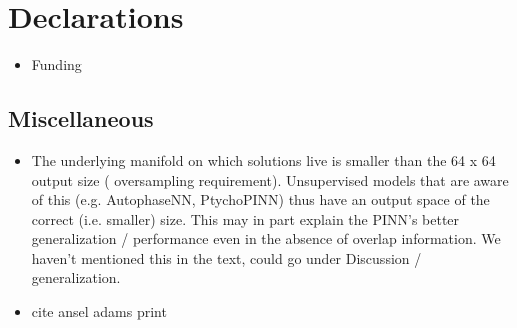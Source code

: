 \documentclass[sn-mathphys]{sn-jnl}%
\theoremstyle{thmstyleone}%
\theoremstyle{thmstyletwo}%
\theoremstyle{thmstylethree}%
\begin{document}
\backmatter



\section*{Declarations}

\begin{itemize}
\item Funding
\end{itemize}


\bigskip


\begin{appendices}

\section*{Miscellaneous}
\begin{itemize}

\item The underlying manifold on which solutions live is smaller than the 64 x 64 output size ( oversampling requirement). Unsupervised models that are aware of this (e.g. AutophaseNN, PtychoPINN) thus have an output space of the correct (i.e. smaller) size. This may in part explain the PINN's better generalization / performance even in the absence of overlap information. We haven't mentioned this in the text, could go under Discussion / generalization.
\item cite ansel adams print \cite{adams1944mount}
\end{itemize}


\end{appendices}
\end{document}
